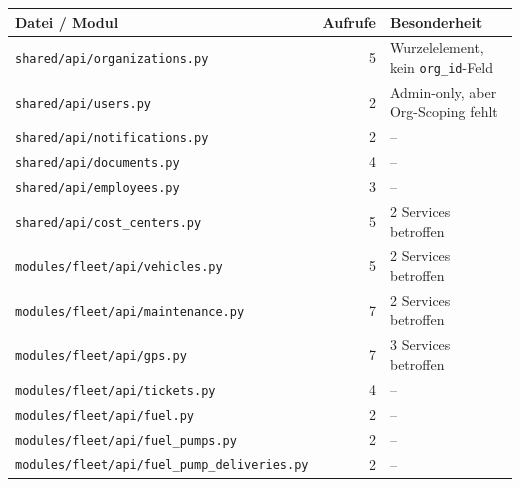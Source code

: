 \begin{table}[H]
    \begin{center}
        \renewcommand{\arraystretch}{1.4}
        \begin{tabular}{|l|r|l|}
            \hline
            \textbf{Datei / Modul}                               & \textbf{Aufrufe} & \textbf{Besonderheit}                     \\
            \hline
            \texttt{shared/api/organizations.py}                 & 5                & Wurzelelement, kein \texttt{org\_id}-Feld \\
            \texttt{shared/api/users.py}                         & 2                & Admin-only, aber Org-Scoping fehlt        \\
            \texttt{shared/api/notifications.py}                 & 2                & --                                        \\
            \texttt{shared/api/documents.py}                     & 4                & --                                        \\
            \texttt{shared/api/employees.py}                     & 3                & --                                        \\
            \texttt{shared/api/cost\_centers.py}                 & 5                & 2 Services betroffen                      \\
            \hline
            \texttt{modules/fleet/api/vehicles.py}               & 5                & 2 Services betroffen                      \\
            \texttt{modules/fleet/api/maintenance.py}            & 7                & 2 Services betroffen                      \\
            \texttt{modules/fleet/api/gps.py}                    & 7                & 3 Services betroffen                      \\
            \texttt{modules/fleet/api/tickets.py}                & 4                & --                                        \\
            \texttt{modules/fleet/api/fuel.py}                   & 2                & --                                        \\
            \texttt{modules/fleet/api/fuel\_pumps.py}            & 2                & --                                        \\
            \texttt{modules/fleet/api/fuel\_pump\_deliveries.py} & 2                & --                                        \\

\end{tabular}
\end{center}
\end{table}
